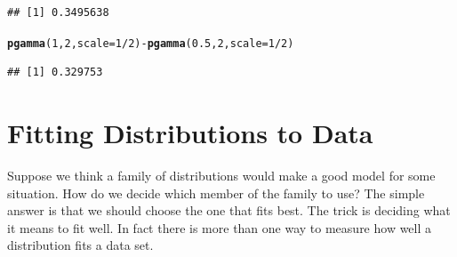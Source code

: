 \documentclass[twoside]{book}\usepackage[]{graphicx}\usepackage[]{xcolor}
\makeatletter
\newcommand{\hlnum}[1]{\textcolor[rgb]{0.686,0.059,0.569}{#1}}%
\newcommand{\hlopt}[1]{\textcolor[rgb]{0,0,0}{#1}}%
\newcommand{\hlstd}[1]{\textcolor[rgb]{0.345,0.345,0.345}{#1}}%
\newcommand{\hlkwc}[1]{\textcolor[rgb]{0.333,0.667,0.333}{#1}}%
\newcommand{\hlkwd}[1]{\textcolor[rgb]{0.737,0.353,0.396}{\textbf{#1}}}%
\newenvironment{kframe}{%
 \def\at@end@of@kframe{}%
 \ifinner\ifhmode%
  \def\at@end@of@kframe{\end{minipage}}%
  \begin{minipage}{\columnwidth}%
 \fi\fi%
 \def\FrameCommand##1{\hskip\@totalleftmargin \hskip-\fboxsep
 \colorbox{shadecolor}{##1}\hskip-\fboxsep
     \hskip-\linewidth \hskip-\@totalleftmargin \hskip\columnwidth}%
 \MakeFramed {\advance\hsize-\width
   \@totalleftmargin\z@ \linewidth\hsize
   \@setminipage}}%
 {\par\unskip\endMakeFramed%
 \at@end@of@kframe}
\newenvironment{knitrout}{}{} %
\makeatother
\begin{document}
\begin{solution}
\begin{knitrout}
\begin{kframe}
\begin{verbatim}
## [1] 0.3495638
\end{verbatim}
\begin{alltt}
\hlkwd{pgamma}\hlstd{(}\hlnum{1}\hlstd{,} \hlnum{2}\hlstd{,} \hlkwc{scale} \hlstd{=} \hlnum{1}\hlopt{/}\hlnum{2}\hlstd{)} \hlopt{-} \hlkwd{pgamma}\hlstd{(}\hlnum{0.5}\hlstd{,} \hlnum{2}\hlstd{,} \hlkwc{scale} \hlstd{=} \hlnum{1}\hlopt{/}\hlnum{2}\hlstd{)}
\end{alltt}
\begin{verbatim}
## [1] 0.329753
\end{verbatim}
\end{kframe}
\end{knitrout}
\end{solution}



\section{Fitting Distributions to Data}

Suppose we think a family of distributions would make a good model for some 
situation.  How do we decide which member of the family to use?  The simple answer
is that we should choose the one that fits best.  The trick is deciding what it 
means to fit well.  In fact there is more than one way to measure how well 
a distribution fits a data set.  
\end{document}
